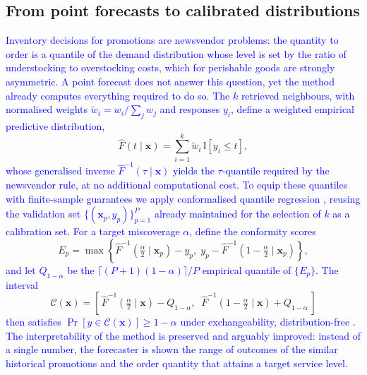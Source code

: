 \documentclass{ieeeaccess}
\newcommand{\myblue}[1]{\textcolor{blue}{#1}}
\begin{document}
\subsection{From point forecasts to calibrated distributions} \label{subSect:probabilistic}

\myblue{Inventory decisions for promotions are newsvendor problems: the
quantity to order is a quantile of the demand distribution whose level is set by
the ratio of understocking to overstocking costs, which for perishable goods are
strongly asymmetric. A point forecast does not answer this question, yet the
method already computes everything required to do so. The $k$ retrieved
neighbours, with normalised weights $\tilde{w}_i = w_i / \sum_{j} w_j$ and
responses $y_i$, define a weighted empirical predictive distribution,}
\begin{equation}
\hat{F}(t \mid \mathbf{x}) = \sum_{i=1}^{k} \tilde{w}_i \, \mathbb{I}\!\left[y_i \leq t\right],
\label{eqn:predCDF}
\end{equation}
\myblue{whose generalised inverse $\hat{F}^{-1}(\tau \mid \mathbf{x})$ yields the
$\tau$-quantile required by the newsvendor rule, at no additional computational
cost. To equip these quantiles with finite-sample guarantees we apply
conformalised quantile regression \cite{romano2019cqr}, reusing the validation
set $\{(\mathbf{x}_p, y_p)\}_{p=1}^{P}$ already maintained for the selection of
$k$ as a calibration set. For a target miscoverage $\alpha$, define the
conformity scores}
\begin{equation}
E_p = \max\!\left\{ \hat{F}^{-1}(\tfrac{\alpha}{2}\mid \mathbf{x}_p) - y_p,\; y_p - \hat{F}^{-1}(1-\tfrac{\alpha}{2}\mid \mathbf{x}_p) \right\},
\label{eqn:cqrScore}
\end{equation}
\myblue{and let $Q_{1-\alpha}$ be the $\lceil (P+1)(1-\alpha)\rceil / P$ empirical
quantile of $\{E_p\}$. The interval}
\begin{equation}
\mathcal{C}(\mathbf{x}) = \left[\, \hat{F}^{-1}(\tfrac{\alpha}{2}\mid \mathbf{x}) - Q_{1-\alpha},\;\; \hat{F}^{-1}(1-\tfrac{\alpha}{2}\mid \mathbf{x}) + Q_{1-\alpha} \,\right]
\label{eqn:cqrInterval}
\end{equation}
\myblue{then satisfies $\Pr\!\left[y \in \mathcal{C}(\mathbf{x})\right] \geq
1-\alpha$ under exchangeability, distribution-free
\cite{lei2018distribution}. The interpretability of the method is preserved and
arguably improved: instead of a single number, the forecaster is shown the range
of outcomes of the similar historical promotions and the order quantity that
attains a target service level.}
\end{document}
